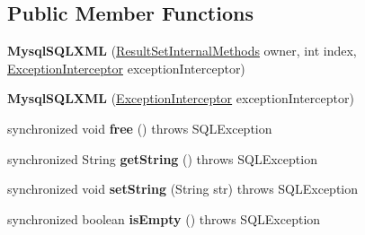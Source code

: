 \subsection*{Public Member Functions}
\begin{DoxyCompactItemize}
\item 
\mbox{\label{classcom_1_1mysql_1_1cj_1_1jdbc_1_1_mysql_s_q_l_x_m_l_a47f9e3571a47550066900bbd85857a6a}} 
{\bfseries Mysql\+S\+Q\+L\+X\+ML} (\mbox{\hyperlink{interfacecom_1_1mysql_1_1cj_1_1jdbc_1_1result_1_1_result_set_internal_methods}{Result\+Set\+Internal\+Methods}} owner, int index, \mbox{\hyperlink{interfacecom_1_1mysql_1_1cj_1_1exceptions_1_1_exception_interceptor}{Exception\+Interceptor}} exception\+Interceptor)
\item 
\mbox{\label{classcom_1_1mysql_1_1cj_1_1jdbc_1_1_mysql_s_q_l_x_m_l_acbcbd21c888cad7b260733a1afb80880}} 
{\bfseries Mysql\+S\+Q\+L\+X\+ML} (\mbox{\hyperlink{interfacecom_1_1mysql_1_1cj_1_1exceptions_1_1_exception_interceptor}{Exception\+Interceptor}} exception\+Interceptor)
\item 
\mbox{\label{classcom_1_1mysql_1_1cj_1_1jdbc_1_1_mysql_s_q_l_x_m_l_a45cf79026854c00d4532b52c4c7a1431}} 
synchronized void {\bfseries free} ()  throws S\+Q\+L\+Exception 
\item 
\mbox{\label{classcom_1_1mysql_1_1cj_1_1jdbc_1_1_mysql_s_q_l_x_m_l_aabe47e5cee6d5aa42529e32f0a1ac45d}} 
synchronized String {\bfseries get\+String} ()  throws S\+Q\+L\+Exception 
\item 
\mbox{\label{classcom_1_1mysql_1_1cj_1_1jdbc_1_1_mysql_s_q_l_x_m_l_a76ebfa8a2a09d7444e1ed47b85fb74b5}} 
synchronized void {\bfseries set\+String} (String str)  throws S\+Q\+L\+Exception 
\item 
\mbox{\label{classcom_1_1mysql_1_1cj_1_1jdbc_1_1_mysql_s_q_l_x_m_l_a2af777f2c823e73aa383dbd2bbfbe596}} 
synchronized boolean {\bfseries is\+Empty} ()  throws S\+Q\+L\+Exception 
\item 

\end{DoxyCompactItemize}
